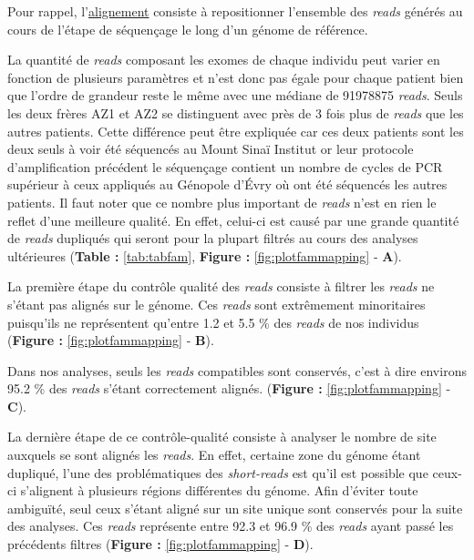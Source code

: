 \documentclass[12pt,twoside]{reedthesis}
\theoremstyle{definition}
\theoremstyle{definition}
\theoremstyle{remark}
\begin{document}
  Pour rappel, l'\href{\%7B\#lalignement\%7D}{alignement} consiste à
  repositionner l'ensemble des \emph{reads} générés au cours de l'étape de
  séquençage le long d'un génome de référence.
  
  La quantité de \emph{reads} composant les exomes de chaque individu peut
  varier en fonction de plusieurs paramètres et n'est donc pas égale pour
  chaque patient bien que l'ordre de grandeur reste le même avec une
  médiane de 91978875 \emph{reads}. Seuls les deux frères AZ1 et AZ2 se
  distinguent avec près de 3 fois plus de \emph{reads} que les autres
  patients. Cette différence peut être expliquée car ces deux patients
  sont les deux seuls à voir été séquencés au Mount Sinaï Institut or leur
  protocole d'amplification précédent le séquençage contient un nombre de
  cycles de PCR supérieur à ceux appliqués au Génopole d'Évry où ont été
  séquencés les autres patients. Il faut noter que ce nombre plus
  important de \emph{reads} n'est en rien le reflet d'une meilleure
  qualité. En effet, celui-ci est causé par une grande quantité de
  \emph{reads} dupliqués qui seront pour la plupart filtrés au cours des
  analyses ultérieures (\textbf{Table :} \ref{tab:tabfam}, \textbf{Figure
  : }\ref{fig:plotfammapping} - \textbf{A}).
  
  La première étape du contrôle qualité des \emph{reads} consiste à
  filtrer les \emph{reads} ne s'étant pas alignés sur le génome. Ces
  \emph{reads} sont extrêmement minoritaires puisqu'ils ne représentent
  qu'entre 1.2 et 5.5 \% des \emph{reads} de nos individus (\textbf{Figure
  : }\ref{fig:plotfammapping} - \textbf{B}).
  
  Dans nos analyses, seuls les \emph{reads} compatibles sont conservés,
  c'est à dire environs 95.2 \% des \emph{reads} s'étant correctement
  alignés. (\textbf{Figure : }\ref{fig:plotfammapping} - \textbf{C}).
  
  La dernière étape de ce contrôle-qualité consiste à analyser le nombre
  de site auxquels se sont alignés les \emph{reads}. En effet, certaine
  zone du génome étant dupliqué, l'une des problématiques des
  \emph{short-reads} est qu'il est possible que ceux-ci s'alignent à
  plusieurs régions différentes du génome. Afin d'éviter toute ambiguïté,
  seul ceux s'étant aligné sur un site unique sont conservés pour la suite
  des analyses. Ces \emph{reads} représente entre 92.3 et 96.9 \% des
  \emph{reads} ayant passé les précédents filtres (\textbf{Figure :
  }\ref{fig:plotfammapping} - \textbf{D}).
  
  \newpage 
  
\end{document}
